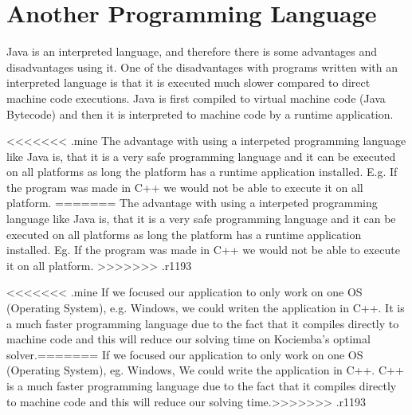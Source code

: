\section{Another Programming Language}
Java is an interpreted language, and therefore there is some advantages and disadvantages using it. One of the disadvantages with programs written with an interpreted language is that it is executed much slower compared to direct machine code executions. Java is first compiled to virtual machine code (Java Bytecode) and then it is interpreted to machine code by a runtime application.

<<<<<<< .mine
The advantage with using a interpeted programming language like Java is, that it is a very safe programming language and it can be executed on all platforms as long the platform has a runtime application installed. E.g. If the program was made in C++ we would not be able to execute it on all platform.
=======
The advantage with using a interpeted programming language like Java is, that it is a very safe programming language and it can be executed on all platforms as long the platform has a runtime application installed. Eg. If the program was made in C++ we would not be able to execute it on all platform.
>>>>>>> .r1193

<<<<<<< .mine
If we focused our application to only work on one OS (Operating System), e.g. Windows, we could writen the application in C++. It is a much faster programming language due to the fact that it compiles directly to machine code and this will reduce our solving time on Kociemba's optimal solver.=======
If we focused our application to only work on one OS (Operating System), eg. Windows, We could write the application in C++. C++ is a much faster programming language due to the fact that it compiles directly to machine code and this will reduce our solving time.>>>>>>> .r1193
